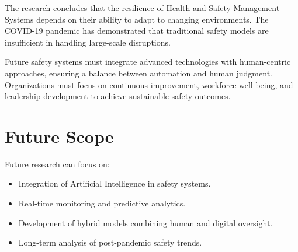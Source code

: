 \documentclass[conference]{IEEEtran}
\begin{document}
The research concludes that the resilience of Health and Safety Management Systems depends on their ability to adapt to changing environments. The COVID-19 pandemic has demonstrated that traditional safety models are insufficient in handling large-scale disruptions.

Future safety systems must integrate advanced technologies with human-centric approaches, ensuring a balance between automation and human judgment. Organizations must focus on continuous improvement, workforce well-being, and leadership development to achieve sustainable safety outcomes.

\section{Future Scope}

Future research can focus on:

\begin{itemize}
\item Integration of Artificial Intelligence in safety systems.
\item Real-time monitoring and predictive analytics.
\item Development of hybrid models combining human and digital oversight.
\item Long-term analysis of post-pandemic safety trends.
\end{itemize}
\end{document}
